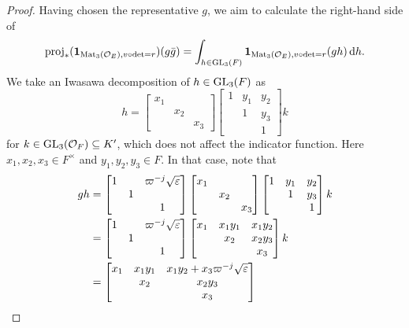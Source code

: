 \begin{proof}
  Having chosen the representative $g$, we aim to calculate the right-hand side of
  \[
    \rproj_\ast(\mathbf{1}_{\Mat_3(\OO_E), v\circ\det=r})(g\bar{g})
    = \int_{h \in \GL_3(F)} \mathbf{1}_{\Mat_3(\OO_E), v\circ\det=r}(gh) \odif h.
  \]
  We take an Iwasawa decomposition of $h \in \operatorname{GL}_3(F)$ as
  \[
    h =
    \begin{bmatrix} x_1 \\ & x_2 \\ && x_3 \end{bmatrix}
    \begin{bmatrix} 1 & y_1 & y_2 \\ & 1 & y_3 \\ & & 1 \end{bmatrix}
    k
  \]
  for $k \in \operatorname{GL}_3(\mathcal O_F) \subseteq K'$, which does not affect the indicator function.
  Here $x_1, x_2, x_3 \in F^\times$ and $y_1, y_2, y_3 \in F$.
  In that case, note that
  \begin{align*}
    gh
    &=
    \begin{bmatrix}
      1 &   & \varpi^{-j}\sqrt\eps \\
      & 1 \\
      &   & 1
    \end{bmatrix}
    \begin{bmatrix} x_1 \\ & x_2 \\ && x_3 \end{bmatrix}
    \begin{bmatrix} 1 & y_1 & y_2 \\ & 1 & y_3 \\ & & 1 \end{bmatrix} k \\
    &=
    \begin{bmatrix}
      1 &   & \varpi^{-j}\sqrt\eps \\
      & 1 \\
      &   & 1
    \end{bmatrix}
    \begin{bmatrix} x_1 & x_1 y_1 & x_1 y_2 \\ & x_2 & x_2 y_3 \\ & & x_3 \end{bmatrix} k \\
    &=
    \begin{bmatrix}
      x_1 & x_1 y_1 & x_1 y_2 + x_3 \varpi^{-j} \sqrt\eps \\
      & x_2 & x_2 y_3 \\
      & & x_3
    \end{bmatrix}

\end{align*}
\end{proof}
